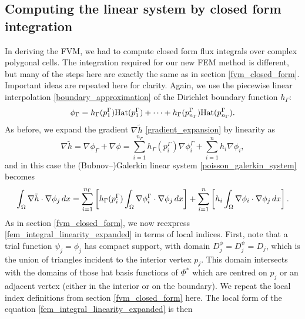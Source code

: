 \subsection{Computing the linear system by closed form integration}
In deriving the FVM, we had to compute closed form flux integrals over complex polygonal cells.
The integration required for our new FEM method is different, but many of the steps here are exactly the same as
in section \ref{fvm_closed_form}. Important ideas are repeated here for clarity.
Again, we use the piecewise linear interpolation \eqref{boundary_approximation} of the Dirichlet boundary function $h_\Gamma$:
\begin{equation*}
    \phi_\Gamma = h_\Gamma(p^\Gamma_1)\text{Hat}(p^\Gamma_1)
                + \cdots
                + h_\Gamma(p^\Gamma_{n_\Gamma})\text{Hat}(p^\Gamma_{n_\Gamma}).
\end{equation*}
As before, we expand the gradient $\nabla\tilde{h}$ \eqref{gradient_expansion} by linearity as
\begin{equation*}
    \nabla \tilde{h} = \nabla\phi_\Gamma + \nabla\phi
             = \sum_{i=1}^{n_\Gamma}h_\Gamma(p^\Gamma_i)\nabla\phi^\Gamma_i + \sum_{i=1}^n h_i\nabla\phi_i,
\end{equation*}
and in this case the (Bubnov--)Galerkin linear system \eqref{poisson_galerkin_system} becomes
\begin{equation}\label{fem_integral_linearity_expanded}
    \int_{{\Omega}} \nabla \tilde{h}\cdot \nabla \phi_j\,dx
    =
    \sum_{i=1}^{n_\Gamma}\left[h_\Gamma(p^\Gamma_i)\int_{{\Omega}}\nabla\phi^\Gamma_i\cdot\nabla\phi_j\,dx\right]
    + \sum_{i=1}^n\left[h_i\int_{{\Omega}}\nabla\phi_i\cdot\nabla\phi_j\,dx\right].
\end{equation}
As in section \ref{fvm_closed_form}, we now reexpress \eqref{fem_integral_linearity_expanded} in terms of local indices. First, note that a trial function
$\psi_j = \phi_j$ has compact support, with domain $D^\phi_j = D^\psi_j = D_j$,
which is the union of triangles incident to the interior vertex $p_j$.
This domain intersects with the domains of those hat basis functions of $\Phi^*$ which are centred on $p_j$ or an adjacent vertex
(either in the interior or on the boundary).
We repeat the local index definitions from section \ref{fvm_closed_form} here.
The local form of the equation \eqref{fem_integral_linearity_expanded} is then

